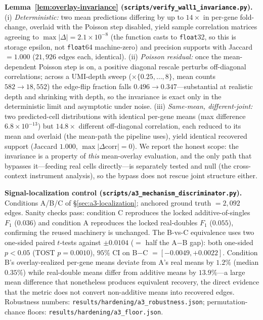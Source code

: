 \documentclass{article}
\theoremstyle{plain}
\theoremstyle{definition}
\theoremstyle{remark}
\begin{document}
\textbf{Lemma~\ref{lem:overlay-invariance} (\texttt{scripts/verify\_wall1\_invariance.py}).} (i) \emph{Deterministic:} two mean predictions differing by up to $14\times$ in per-gene fold-change, overlaid with the Poisson step disabled, yield sample correlation matrices agreeing to $\max|\Delta| = 2.1\times10^{-8}$ (the function casts to \texttt{float}32, so this is storage epsilon, not \texttt{float}64 machine-zero) and precision supports with Jaccard $= 1.000$ ($21{,}926$ edges each, identical). (ii) \emph{Poisson residual:} once the mean-dependent Poisson step is on, a positive diagonal rescale perturbs off-diagonal correlations; across a UMI-depth sweep ($\times\{0.25,\dots,8\}$, mean counts $582 \to 18{,}552$) the edge-flip fraction falls $0.496 \to 0.347$---substantial at realistic depth and shrinking with depth, so the invariance is exact only in the deterministic limit and asymptotic under noise. (iii) \emph{Same-mean, different-joint:} two predicted-cell distributions with identical per-gene means (max difference $6.8\times10^{-13}$) but $14.8\times$ different off-diagonal correlation, each reduced to its mean and overlaid (the mean-path the pipeline uses), yield identical recovered support (Jaccard $1.000$, $\max|\Delta\mathrm{corr}| = 0$). We report the honest scope: the invariance is a property of \emph{this} mean-overlay evaluation, and the only path that bypasses it---feeding real cells directly---is separately tested and null (the cross-context instrument analysis), so the bypass does not rescue joint structure either.

\textbf{Signal-localization control (\texttt{scripts/a3\_mechanism\_discriminator.py}).} Conditions A/B/C of \S\ref{sec:a3-localization}; anchored ground truth $= 2{,}092$ edges. Sanity checks pass: condition C reproduces the locked additive-of-singles $F_1$ ($0.036$) and condition A reproduces the locked real-doubles $F_1$ ($0.055$), confirming the reused machinery is unchanged. The B-vs-C equivalence uses two one-sided paired $t$-tests against $\pm 0.0104$ ($=$ half the A$-$B gap): both one-sided $p < 0.05$ (TOST $p = 0.0010$), $95\%$ CI on B$-$C $= [-0.0049, +0.0022]$. Condition B's overlay-realized per-gene means deviate from A's real means by $1.2\%$ (median $0.35\%$) while real-double means differ from additive means by $13.9\%$---a large mean difference that nonetheless produces equivalent recovery, the direct evidence that the metric does not convert non-additive means into recovered edges. Robustness numbers: \texttt{results/hardening/a3\_robustness.json}; permutation-chance floors: \texttt{results/hardening/a3\_floor.json}.
\end{document}

